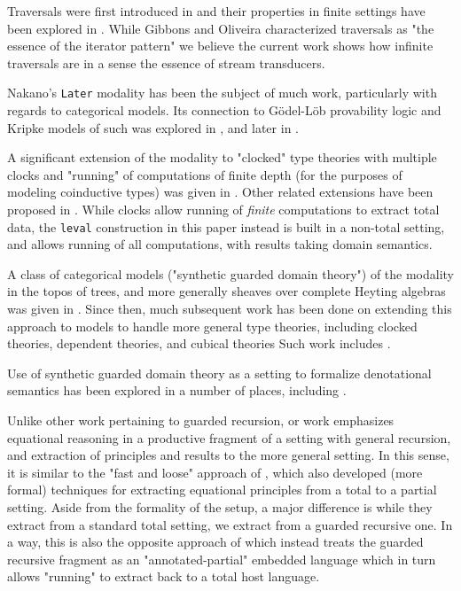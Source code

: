 \documentclass[hoptionsi,review,format=sigplan]{acmart}
\newcommand{\hs}{\texttt}
\begin{document}
Traversals were first introduced in \cite{mcbride2008applicative} and their properties in finite settings have been explored in \cite{gibbons2009essence, jaskelioff2012investigation, bird2013understanding, jaskelioff2015representation}. While Gibbons and Oliveira characterized traversals as "the essence of the iterator pattern" we believe the current work shows how infinite traversals are in a sense the essence of stream transducers.

Nakano's \hs{Later} modality \cite{nakano2000modality} has been the subject of much work, particularly with regards to categorical models. Its connection to Gödel-Löb provability logic and Kripke models of such was explored in \cite{nakano2001fixed}, and later in \cite{kavvos2017intensionality, kavvos2017semantics, chen-ko:2022}.

 A significant extension of the modality to "clocked" type theories with multiple clocks and "running" of computations of finite depth (for the purposes of modeling coinductive types) was given in \cite{atkey2013productive}. Other related extensions have been proposed in \cite{birkedal2017guarded, guatto:2018}. While clocks allow running of \emph{finite} computations to extract total data, the \hs{leval} construction in this paper instead is built in a non-total setting, and allows running of all computations, with results taking domain semantics.

A class of categorical models ("synthetic guarded domain theory") of the modality in the topos of trees, and more generally sheaves over complete Heyting algebras was given in \cite{birkedal2011first}. Since then, much subsequent work has been done on extending this approach to models to handle more general type theories, including clocked theories, dependent theories, and cubical theories Such work includes \cite{gratzer-birkedal:2022, sterling-harper:2018, bbcgsv:2019, bizjak2020denotational, palombi-sterling:2022}.

Use of synthetic guarded domain theory as a setting to formalize denotational semantics has been explored in a number of places, including \cite{paviotti:2016, mogelberg-paviotti:2016, paviotti-mogelberg-birkedal:2015}.

Unlike other work pertaining to guarded recursion, or work emphasizes equational reasoning in a productive fragment of a setting with general recursion, and extraction of principles and results to the more general setting. In this sense, it is similar to the "fast and loose" approach of \cite{danielsson2006fast}, which also developed (more formal) techniques for extracting equational principles from a total to a partial setting. Aside from the formality of the setup, a major difference is while they extract from a standard total setting, we extract from a guarded recursive one. In a way, this is also the opposite approach of \cite{atkey2013productive} which instead treats the guarded recursive fragment as an "annotated-partial" embedded language which in turn allows "running" to extract back to a total host language.
\end{document}
